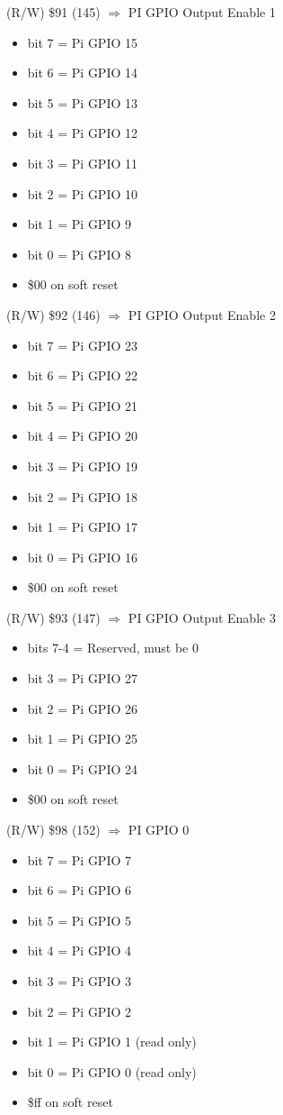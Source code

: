 (R/W) \$91 (145) $\Rightarrow$ PI GPIO Output Enable 1
\begin{itemize}
\item bit 7 = Pi GPIO 15
\item bit 6 = Pi GPIO 14
\item bit 5 = Pi GPIO 13
\item bit 4 = Pi GPIO 12
\item bit 3 = Pi GPIO 11
\item bit 2 = Pi GPIO 10
\item bit 1 = Pi GPIO 9
\item bit 0 = Pi GPIO 8
\item[] \$00 on soft reset
\end{itemize}

(R/W) \$92 (146) $\Rightarrow$ PI GPIO Output Enable 2
\begin{itemize}
\item bit 7 = Pi GPIO 23
\item bit 6 = Pi GPIO 22
\item bit 5 = Pi GPIO 21
\item bit 4 = Pi GPIO 20
\item bit 3 = Pi GPIO 19
\item bit 2 = Pi GPIO 18
\item bit 1 = Pi GPIO 17
\item bit 0 = Pi GPIO 16
\item[] \$00 on soft reset
\end{itemize}

(R/W) \$93 (147) $\Rightarrow$ PI GPIO Output Enable 3
\begin{itemize}
\item bits 7-4 = Reserved, must be 0
\item bit 3 = Pi GPIO 27
\item bit 2 = Pi GPIO 26
\item bit 1 = Pi GPIO 25
\item bit 0 = Pi GPIO 24
\item[] \$00 on soft reset
\end{itemize}

(R/W) \$98 (152) $\Rightarrow$ PI GPIO 0
\begin{itemize}
\item bit 7 = Pi GPIO 7
\item bit 6 = Pi GPIO 6
\item bit 5 = Pi GPIO 5
\item bit 4 = Pi GPIO 4
\item bit 3 = Pi GPIO 3
\item bit 2 = Pi GPIO 2
\item bit 1 = Pi GPIO 1 (read only)
\item bit 0 = Pi GPIO 0 (read only)
\item[] \$ff on soft reset
\end{itemize}

